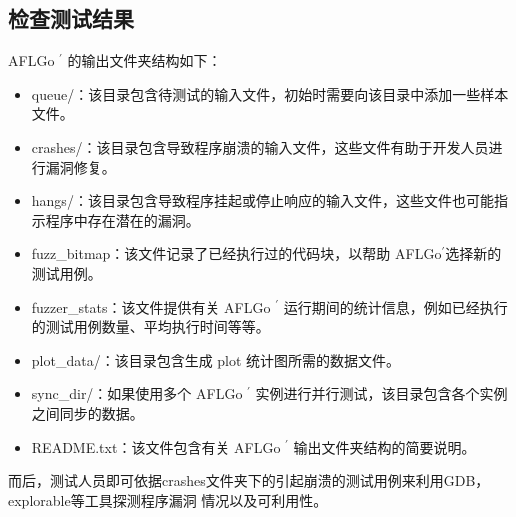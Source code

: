 \documentclass[bachelor]{njupthesis}
\begin{document}
\subsection{检查测试结果}
AFLGo $^\prime$ 的输出文件夹结构如下：
\begin{itemize}[leftmargin=36pt]
	\item queue/：该目录包含待测试的输入文件，初始时需要向该目录中添加一些样本文件。
	\item crashes/：该目录包含导致程序崩溃的输入文件，这些文件有助于开发人员进行漏洞修复。
	\item hangs/：该目录包含导致程序挂起或停止响应的输入文件，这些文件也可能指示程序中存在潜在的漏洞。
	\item fuzz\_bitmap：该文件记录了已经执行过的代码块，以帮助 AFLGo$^ \prime$选择新的测试用例。
	\item fuzzer\_stats：该文件提供有关 AFLGo $^\prime $ 运行期间的统计信息，例如已经执行的测试用例数量、平均执行时间等等。
	\item plot\_data/：该目录包含生成 plot 统计图所需的数据文件。
	\item sync\_dir/：如果使用多个 AFLGo $^\prime$ 实例进行并行测试，该目录包含各个实例之间同步的数据。
	\item README.txt：该文件包含有关 AFLGo $^\prime$ 输出文件夹结构的简要说明。
\end{itemize}

而后，测试人员即可依据crashes文件夹下的引起崩溃的测试用例来利用GDB，explorable等工具探测程序漏洞
情况以及可利用性。
\end{document}

